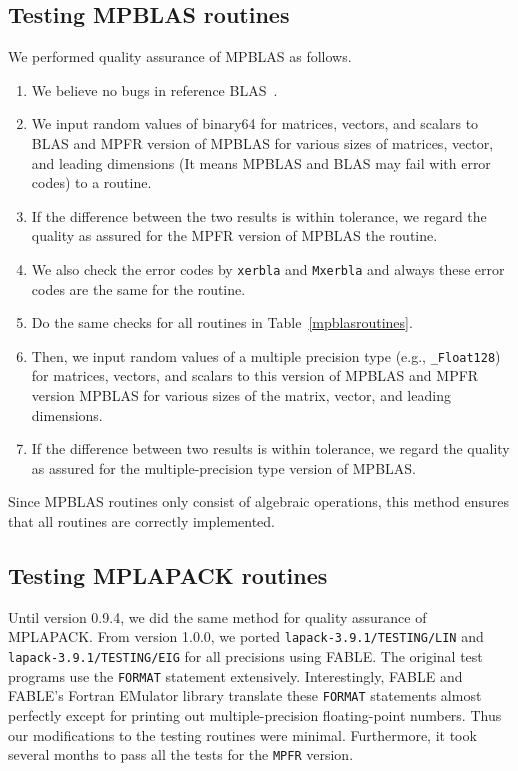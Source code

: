 \documentclass[12pt]{article}
\begin{document}
\subsection{Testing MPBLAS routines}
We performed quality assurance of MPBLAS as follows. 
\begin{enumerate}
    \item We believe no bugs in reference BLAS~\cite{10.1145/567806.567807}.
    \item We input random values of binary64 for matrices, vectors, and scalars to BLAS and MPFR version of MPBLAS for various sizes of matrices, vector, and leading dimensions (It means MPBLAS and BLAS may fail with error codes) to a routine.
    \item If the difference between the two results is within tolerance, we regard the quality as assured for the MPFR version of MPBLAS the routine.
    \item We also check the error codes by {\tt xerbla} and {\tt Mxerbla} and always these error codes are the same for the routine.
    \item Do the same checks for all routines in Table~\ref{mpblasroutines}.
    \item Then, we input random values of a multiple precision type (e.g., {\tt \_Float128}) for matrices, vectors, and scalars to this version of MPBLAS and MPFR version MPBLAS for various sizes of the matrix, vector, and leading dimensions.
    \item If the difference between two results is within tolerance, we regard the quality as assured for the multiple-precision type version of MPBLAS.
\end{enumerate}
Since MPBLAS routines only consist of algebraic operations, this method ensures that all routines are correctly implemented. 

\subsection{Testing MPLAPACK routines}
Until version 0.9.4, we did the same method for quality assurance of MPLAPACK. From version 1.0.0, we ported {\tt lapack-3.9.1/TESTING/LIN} and {\tt lapack-3.9.1/TESTING/EIG} for all precisions using FABLE. The original test programs
use the {\tt FORMAT} statement extensively. Interestingly, FABLE and FABLE's Fortran EMulator library translate these {\tt FORMAT} statements almost perfectly except for printing out multiple-precision floating-point numbers. Thus our modifications to the testing routines were minimal. Furthermore, it took several months to pass all the tests for the {\tt MPFR} version.
\end{document}
